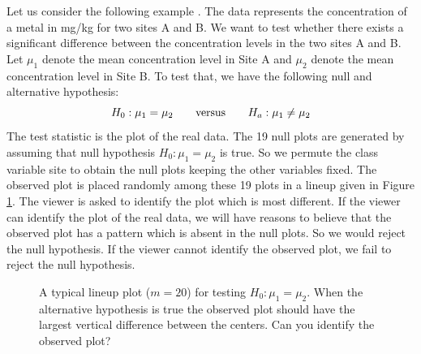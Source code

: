 Let us consider the following example . The data represents the concentration of a metal in mg/kg for two sites A and B.
We want to test whether there exists a significant difference between the concentration levels in the two sites A and B. Let $\mu_1$ denote the mean concentration level in Site A and $\mu_2$ denote the mean concentration level in Site B. To test that, we have the following null and alternative hypothesis:
\[
H_0: \mu_1 = \mu_2 \qquad \hbox{versus} \qquad H_a: \mu_1 \ne \mu_2
\]
The test statistic is the plot of the real data. The 19 null plots are generated by assuming that null hypothesis $H_0: \mu_1 =  \mu_2$ is true. So we permute the class variable site to obtain the null plots keeping the other variables fixed. The observed plot is placed randomly among these 19 plots in a lineup given in Figure \ref{lineup}. The viewer is asked to identify the plot which is most different. If the viewer can identify the plot of the real data, we will have reasons to believe that the observed plot has a pattern which is absent in the null plots. So we would reject the null hypothesis. If the viewer cannot identify the observed plot, we fail to reject the null hypothesis. \\

\begin{figure}[hbtp]
   \centering
      \caption{A typical lineup plot ($m = 20$) for testing $H_0: \mu_1 =  \mu_2$. 
      When the alternative hypothesis is true the observed plot should have the largest vertical difference between the centers. Can you identify the observed plot?}
      \label{lineup}
\end{figure}

